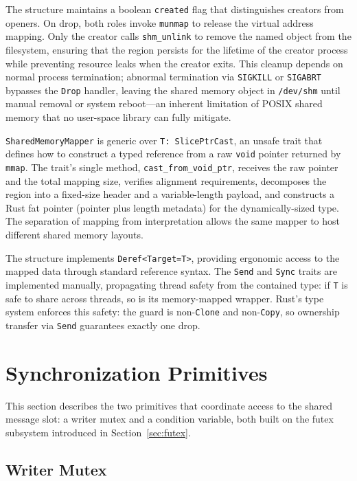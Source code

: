The structure maintains a boolean \texttt{created} flag that distinguishes creators from openers.
On drop, both roles invoke \texttt{munmap} to release the virtual address mapping. Only the creator calls \texttt{shm\_unlink} to remove the named object from the filesystem, ensuring that the region persists for the lifetime of the creator process while preventing resource leaks when the creator exits. This cleanup depends on normal process termination; abnormal termination via \texttt{SIGKILL} or \texttt{SIGABRT} bypasses the \texttt{Drop} handler, leaving the shared memory object in \texttt{/dev/shm} until manual removal or system reboot---an inherent limitation of POSIX shared memory that no user-space library can fully mitigate.

\texttt{SharedMemoryMapper} is generic over \texttt{T:~SlicePtrCast}, an unsafe trait that defines how to construct a typed reference from a raw \texttt{void} pointer returned by \texttt{mmap}.
The trait's single method, \texttt{cast\_from\_void\_ptr}, receives the raw pointer and the total mapping size, verifies alignment requirements, decomposes the region into a fixed-size header and a variable-length payload, and constructs a Rust fat pointer (pointer plus length metadata) for the dynamically-sized type. The separation of mapping from interpretation allows the same mapper to host different shared memory layouts.

The structure implements \texttt{Deref<Target=T>}, providing ergonomic access to the mapped data through standard reference syntax. The \texttt{Send} and \texttt{Sync} traits are implemented manually, propagating thread safety from the contained type: if \texttt{T} is safe to share across threads, so is its memory-mapped wrapper. Rust's type system enforces this safety: the guard is non-\texttt{Clone} and non-\texttt{Copy}, so ownership transfer via \texttt{Send} guarantees exactly one drop.


\newpage
\section{Synchronization Primitives}
\label{sec:sync_impl}

This section describes the two primitives that coordinate access to the shared message slot: a writer mutex and a condition variable, both built on the futex subsystem introduced in Section~\ref{sec:futex}.

\subsection{Writer Mutex}
\label{subsec:writer_mutex}

